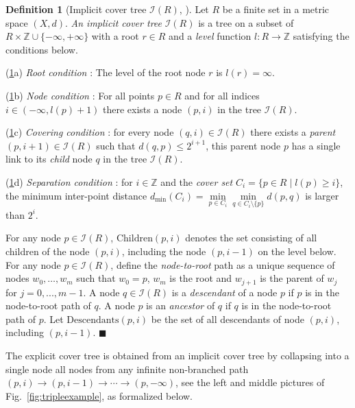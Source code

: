 \documentclass{vgtc}                          %
\numberwithin{algocf}{section}
\theoremstyle{definition}
\newtheorem{dfn}[algocf]{Definition}
\theoremstyle{definition}
\theoremstyle{definition}
\theoremstyle{plain}
\newcommand{\Child}{\mathrm{Children}}
\newcommand{\Desc}{\mathrm{Descendants}}
\newcommand{\Z}{\mathbb{Z}}
\newcommand{\I}{\mathcal{I}}
\newcommand{\bs}{\hfill $\blacksquare$}
\begin{document}
\begin{dfn}[Implicit cover tree $\I(R)$, {\cite[Section~2]{beygelzimer2006cover}}]
	\label{dfn:cover_tree_implicit}
	Let $R$ be a finite set in a metric space $(X,d)$. 
	\emph{An implicit cover tree} $\I(R)$ is a tree on a subset of $R \times \Z \cup \{-\infty, +\infty\}$ with a root $r \in R$ and a \emph{level} function $l : R \rightarrow \Z$ satisfying the conditions below.
	\medskip
	
	\noindent
	(\ref{dfn:cover_tree_implicit}a)
	\emph{Root condition} :  
	The level of the root node $r$ is $l(r) = \infty$. 
	\medskip
	
	\noindent
	(\ref{dfn:cover_tree_implicit}b)
	\emph{Node condition} :  
	For all points $p \in R$ and for all indices $i \in (-\infty, l(p)+1)$
	there exists a node $(p,i)$ in the tree $\I(R)$.
	\medskip
	
	\noindent
	(\ref{dfn:cover_tree_implicit}c)
	\emph{Covering condition} : 
	for every node $(q,i) \in \I(R)$ there exists a \emph{parent} $(p,i+1) \in \I(R)$ 
     such that $d(q,p) \leq 2^{i+1}$, this parent node $p$ has a single link to its  \emph{child} node $q$ in the tree $\I(R)$. 
	\medskip
	
	\noindent
	(\ref{dfn:cover_tree_implicit}d)
	\emph{Separation condition} : 
	for $i \in \Z$ and the \emph{cover set} 
	$C_i = \{p \in R \mid l(p) \geq i\}$,
	the minimum inter-point distance $d_{\min}(C_i) = \min\limits_{p \in C_{i}}\min\limits_{q \in C_{i}\setminus \{p\}} d(p,q)$ is larger than $2^{i}$.
	\medskip
	
	\noindent
 	For any node $p\in\I(R)$, $\Child(p,i)$ denotes the set consisting of all children of the node $(p,i)$, including the node $(p,i-1)$ on the level below.
	For any node $p \in\I(R)$, define the \emph{node-to-root} path as a unique sequence of nodes $w_0,\dots,w_m$ such that $w_0 = p$, $w_m$ is the root and $w_{j+1}$ is the parent of $w_{j}$ for $j=0,...,m-1$. 
	A node $q \in\I(R)$ is a \emph{descendant} of a node $p$ if $p$ is in the node-to-root path of $q$. 
	A node $p$ is an \emph{ancestor} of $q$ if $q$ is in the node-to-root path of $p$. 
	Let $\Desc(p,i)$ be the set of all descendants of node $(p,i)$, including $(p,i-1)$. 
	\bs
\end{dfn} 


\noindent
The explicit cover tree is obtained from an implicit cover tree by collapsing into a single node all nodes from any infinite non-branched path $(p,i)\to(p,i-1)\to\cdots \to(p,-\infty)$, see the left and middle pictures of Fig.~\ref{fig:tripleexample}, as formalized below.
\end{document}

